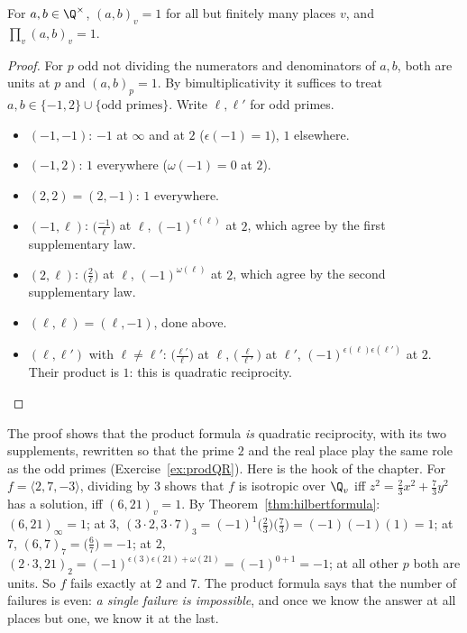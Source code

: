 \begin{theorem}[Hilbert]\label{thm:hilbertproduct}
For $a,b\in\Q^\times$, $(a,b)_v=1$ for all but finitely many places $v$, and $\displaystyle\prod_v(a,b)_v=1$.
\end{theorem}
\begin{proof}
For $p$ odd not dividing the numerators and denominators of $a,b$, both are units at $p$ and $(a,b)_p=1$. By
bimultiplicativity it suffices to treat $a,b\in\{-1,2\}\cup\{\text{odd primes}\}$. Write $\ell,\ell'$ for odd primes.
\begin{itemize}
\item $(-1,-1)$: $-1$ at $\infty$ and at $2$ ($\epsilon(-1)=1$), $1$ elsewhere.
\item $(-1,2)$: $1$ everywhere ($\omega(-1)=0$ at $2$).
\item $(2,2)=(2,-1)$: $1$ everywhere.
\item $(-1,\ell)$: $\bigl(\frac{-1}\ell\bigr)$ at $\ell$, $(-1)^{\epsilon(\ell)}$ at $2$, which agree by the first supplementary law.
\item $(2,\ell)$: $\bigl(\frac2\ell\bigr)$ at $\ell$, $(-1)^{\omega(\ell)}$ at $2$, which agree by the second supplementary law.
\item $(\ell,\ell)=(\ell,-1)$, done above.
\item $(\ell,\ell')$ with $\ell\ne\ell'$: $\bigl(\frac{\ell'}\ell\bigr)$ at $\ell$, $\bigl(\frac\ell{\ell'}\bigr)$ at $\ell'$,
$(-1)^{\epsilon(\ell)\epsilon(\ell')}$ at $2$. Their product is $1$: this is quadratic reciprocity.
\end{itemize}
\end{proof}

The proof shows that the product formula \emph{is} quadratic reciprocity, with its two supplements, rewritten so that the
prime $2$ and the real place play the same role as the odd primes (Exercise~\ref{ex:prodQR}). Here is the hook of the chapter.
For $f=\langle2,7,-3\rangle$, dividing by $3$ shows that $f$ is isotropic over $\Q_v$ iff $z^2=\frac23x^2+\frac73y^2$ has a
solution, iff $(6,21)_v=1$. By Theorem~\ref{thm:hilbertformula}: $(6,21)_\infty=1$; at $3$, $(3\cdot2,3\cdot7)_3=(-1)^{1}
\bigl(\frac23\bigr)\bigl(\frac73\bigr)=(-1)(-1)(1)=1$; at $7$, $(6,7)_7=\bigl(\frac67\bigr)=-1$; at $2$, $(2\cdot3,21)_2=
(-1)^{\epsilon(3)\epsilon(21)+\omega(21)}=(-1)^{0+1}=-1$; at all other $p$ both are units. So $f$ fails exactly at $2$ and $7$.
The product formula says that the number of failures is even: \emph{a single failure is impossible}, and once we know the
answer at all places but one, we know it at the last.

